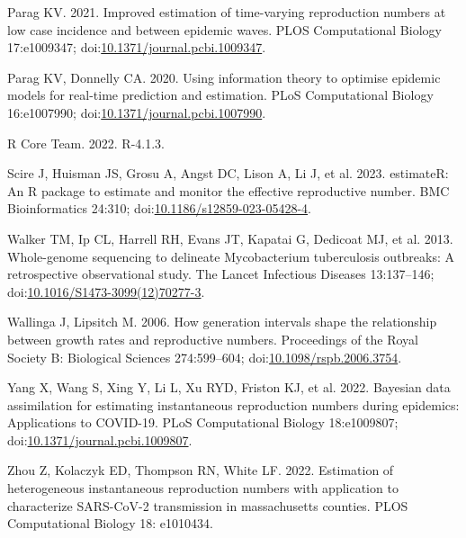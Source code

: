 \documentclass[
  letterpaper,
  DIV=11,
  numbers=noendperiod]{scrreprt}
\newlength{\cslhangindent}
\newenvironment{CSLReferences}[2] %
 {\begin{list}{}{%
  \setlength{\itemindent}{0pt}
  \setlength{\leftmargin}{0pt}
  \setlength{\parsep}{0pt}
  \ifodd #1
   \setlength{\leftmargin}{\cslhangindent}
   \setlength{\itemindent}{-1\cslhangindent}
  \fi
  \setlength{\itemsep}{#2\baselineskip}}}
 {\end{list}}
\begin{document}
\begin{CSLReferences}{1}{1}
Parag KV. 2021. Improved estimation of time-varying reproduction numbers
at low case incidence and between epidemic waves. PLOS Computational
Biology 17:e1009347;
doi:\href{https://doi.org/10.1371/journal.pcbi.1009347}{10.1371/journal.pcbi.1009347}.

Parag KV, Donnelly CA. 2020. Using information theory to optimise
epidemic models for real-time prediction and estimation. PLoS
Computational Biology 16:e1007990;
doi:\href{https://doi.org/10.1371/journal.pcbi.1007990}{10.1371/journal.pcbi.1007990}.

R Core Team. 2022. R-4.1.3.

Scire J, Huisman JS, Grosu A, Angst DC, Lison A, Li J, et al. 2023.
estimateR: An {R} package to estimate and monitor the effective
reproductive number. BMC Bioinformatics 24:310;
doi:\href{https://doi.org/10.1186/s12859-023-05428-4}{10.1186/s12859-023-05428-4}.

Walker TM, Ip CL, Harrell RH, Evans JT, Kapatai G, Dedicoat MJ, et al.
2013. Whole-genome sequencing to delineate {Mycobacterium} tuberculosis
outbreaks: A retrospective observational study. The Lancet Infectious
Diseases 13:137--146;
doi:\href{https://doi.org/10.1016/S1473-3099(12)70277-3}{10.1016/S1473-3099(12)70277-3}.

Wallinga J, Lipsitch M. 2006. How generation intervals shape the
relationship between growth rates and reproductive numbers. Proceedings
of the Royal Society B: Biological Sciences 274:599--604;
doi:\href{https://doi.org/10.1098/rspb.2006.3754}{10.1098/rspb.2006.3754}.

Yang X, Wang S, Xing Y, Li L, Xu RYD, Friston KJ, et al. 2022. Bayesian
data assimilation for estimating instantaneous reproduction numbers
during epidemics: Applications to {COVID}-19. PLoS Computational Biology
18:e1009807;
doi:\href{https://doi.org/10.1371/journal.pcbi.1009807}{10.1371/journal.pcbi.1009807}.

Zhou Z, Kolaczyk ED, Thompson RN, White LF. 2022. Estimation of
heterogeneous instantaneous reproduction numbers with application to
characterize SARS-CoV-2 transmission in massachusetts counties. PLOS
Computational Biology 18: e1010434.

\end{CSLReferences}
\end{document}
